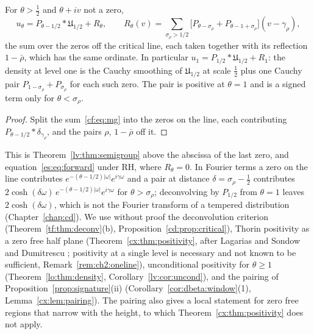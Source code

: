 \begin{proposition}\label{cf:prop:transport}
For $\theta>\frac12$ and $\theta+iv$ not a zero,
\begin{equation}\label{cf:eq:transport}
u_\theta=P_{\theta-1/2}*\mathfrak U_{1/2}+R_\theta,\qquad R_\theta(v)=\sum_{\sigma_\rho>1/2}\bigl[P_{\theta-\sigma_\rho}+P_{\theta-1+\sigma_\rho}\bigr](v-\gamma_\rho),
\end{equation}
the sum over the zeros off the critical line, each taken together with its reflection $1-\bar\rho$, which has the same ordinate. In particular $u_1=P_{1/2}*\mathfrak U_{1/2}+R_1$: the density at level one is the Cauchy smoothing of $\mathfrak U_{1/2}$ at scale $\frac12$ plus one Cauchy pair $P_{1-\sigma_\rho}+P_{\sigma_\rho}$ for each such zero. The pair is positive at $\theta=1$ and is a signed term only for $\theta<\sigma_\rho$.
\end{proposition}

\begin{proof}
Split the sum~\eqref{cf:eq:mg} into the zeros on the line, each contributing $P_{\theta-1/2}*\delta_{\gamma_\rho}$, and the pairs $\rho$, $1-\bar\rho$ off it.
\end{proof}

This is Theorem~\ref{lv:thm:semigroup} above the abscissa of the last zero, and equation~\eqref{es:eq:forward} under RH, where $R_\theta=0$. In Fourier terms a zero on the line contributes $e^{-(\theta-1/2)\lvert\omega\rvert}e^{i\gamma\omega}$ and a pair at distance $\delta=\sigma_\rho-\frac12$ contributes $2\cosh(\delta\omega)\,e^{-(\theta-1/2)\lvert\omega\rvert}e^{i\gamma\omega}$ for $\theta>\sigma_\rho$; deconvolving by $P_{1/2}$ from $\theta=1$ leaves $2\cosh(\delta\omega)$, which is not the Fourier transform of a tempered distribution (Chapter~\ref{chap:cd}). We use without proof the deconvolution criterion (Theorem~\ref{tf:thm:deconv}(b), Proposition~\ref{cd:prop:critical}), Thorin positivity as a zero free half plane (Theorem~\ref{cx:thm:positivity}, after Lagarias \cite{Lagarias} and Sondow and Dumitrescu \cite{SD10}; positivity at a single level is necessary and not known to be sufficient, Remark~\ref{rem:ch2:oneline}), unconditional positivity for $\theta\ge1$ (Theorem~\ref{lo:thm:density}, Corollary~\ref{lv:cor:uncond}), and the pairing of Proposition~\ref{prop:signature}(ii) (Corollary~\ref{cor:dbeta:window}(1), Lemma~\ref{cx:lem:pairing}). The pairing also gives a local statement for zero free regions that narrow with the height, to which Theorem~\ref{cx:thm:positivity} does not apply.

